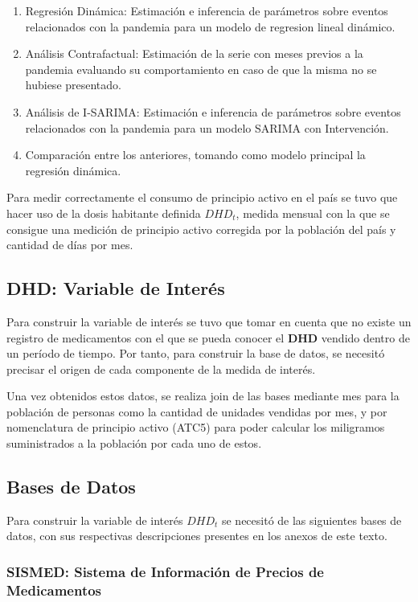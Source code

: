 \documentclass[10pt,twoside,xcolor=table,x11anmes]{IEEEtran}
\begin{document}
\begin{enumerate}
    \item Regresión Dinámica: Estimación e inferencia de parámetros sobre eventos relacionados con la pandemia para un modelo de regresion lineal dinámico.
    \item Análisis Contrafactual: Estimación de la serie con meses previos a la pandemia evaluando su comportamiento en caso de que la misma no se hubiese presentado.
    \item Análisis de I-SARIMA: Estimación e inferencia de parámetros sobre eventos relacionados con la pandemia para un modelo SARIMA con Intervención.
    \item Comparación entre los anteriores, tomando como modelo principal la regresión dinámica.
\end{enumerate}

Para medir correctamente el consumo de principio activo en el país se tuvo que hacer uso de la dosis habitante definida $DHD_t$, medida mensual con la que se consigue una medición de principio activo corregida por la población del país y cantidad de días por mes. 

\subsection{DHD: Variable de Interés} 

Para construir la variable de interés se tuvo que tomar en cuenta que no existe un registro de medicamentos con el que se pueda conocer el \textbf{DHD} vendido dentro de un período de tiempo. Por tanto, para construir la base de datos, se necesitó precisar el origen de cada componente de la medida de interés. 

Una vez obtenidos estos datos, se realiza join de las bases mediante mes para la población de personas como la cantidad de unidades vendidas por mes, y por nomenclatura de principio activo (ATC5) para poder calcular los miligramos suministrados a la población por cada uno de estos. 

\subsection{Bases de Datos}
            
Para construir la variable de interés $DHD_t$ se necesitó de las siguientes bases de datos, con sus respectivas descripciones presentes en los anexos de este texto.


\subsubsection{SISMED: Sistema de Información de Precios de Medicamentos}
\end{document}
